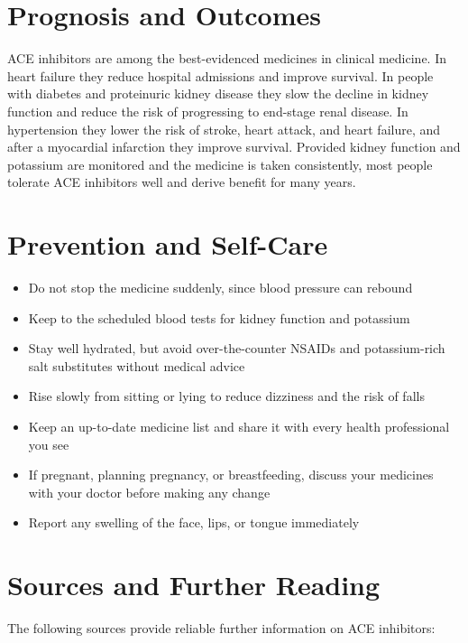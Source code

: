 \section*{Prognosis and Outcomes}
ACE inhibitors are among the best-evidenced medicines in clinical medicine. In heart failure they reduce hospital admissions and improve survival. In people with diabetes and proteinuric kidney disease they slow the decline in kidney function and reduce the risk of progressing to end-stage renal disease. In hypertension they lower the risk of stroke, heart attack, and heart failure, and after a myocardial infarction they improve survival. Provided kidney function and potassium are monitored and the medicine is taken consistently, most people tolerate ACE inhibitors well and derive benefit for many years.

\section*{Prevention and Self-Care}
\begin{itemize}
    \item Do not stop the medicine suddenly, since blood pressure can rebound
    \item Keep to the scheduled blood tests for kidney function and potassium
    \item Stay well hydrated, but avoid over-the-counter NSAIDs and potassium-rich salt substitutes without medical advice
    \item Rise slowly from sitting or lying to reduce dizziness and the risk of falls
    \item Keep an up-to-date medicine list and share it with every health professional you see
    \item If pregnant, planning pregnancy, or breastfeeding, discuss your medicines with your doctor before making any change
    \item Report any swelling of the face, lips, or tongue immediately
\end{itemize}

\section*{Sources and Further Reading}
The following sources provide reliable further information on ACE inhibitors:

